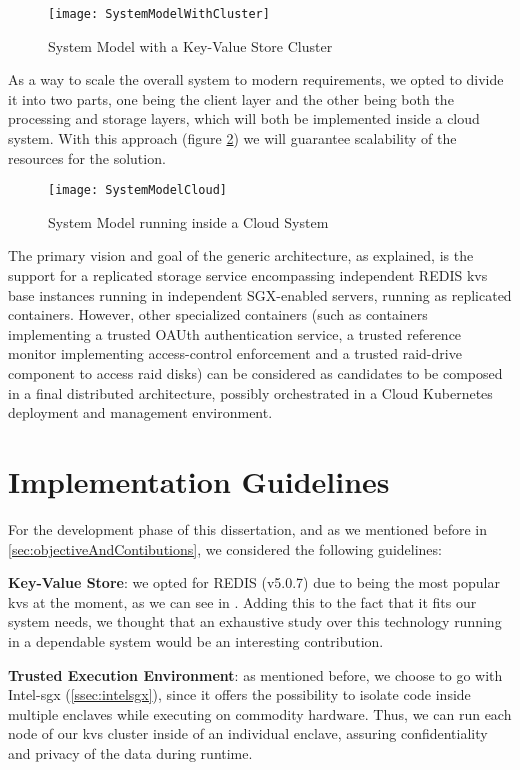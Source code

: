 \begin{figure}[htbp]
	\centering
	{\texttt{[image: SystemModelWithCluster]}}
	\caption{System Model with a Key-Value Store Cluster}
	\label{fig:systemModelCluster}
\end{figure}

As a way to scale the overall system to modern requirements, we opted to divide it into two parts, one being the client layer and the other being both the processing and storage layers, which will both be implemented inside a cloud system. With this approach (figure \ref{fig:systemModelCloud}) we will guarantee scalability of the resources for the solution. 

\begin{figure}[htbp]
	\centering
	{\texttt{[image: SystemModelCloud]}}
	\caption{System Model running inside a Cloud System}
	\label{fig:systemModelCloud}
\end{figure}

The primary vision and goal of the generic architecture, as explained, is the support for a replicated storage service encompassing independent REDIS \gls{kvs} base instances running in independent SGX-enabled servers, running as replicated containers. However, other specialized containers (such as containers implementing a trusted OAUth authentication service, a trusted reference monitor implementing access-control enforcement and a trusted \gls{raid}-drive component to access \gls{raid} disks) can be considered as candidates to be composed in a final distributed architecture, possibly orchestrated in a Cloud Kubernetes deployment and management environment.

\section{Implementation Guidelines} %

For the development phase of this dissertation, and as we mentioned before in \ref{sec:objectiveAndContibutions}, we considered the following guidelines:

\textbf{Key-Value Store}: we opted for REDIS (v5.0.7) due to being the most popular \gls{kvs} at the moment, as we can see in \cite{rankingKVStores}. Adding this to the fact that it fits our system needs, we thought that an exhaustive study over this technology running in a dependable system would be an interesting contribution.

\textbf{Trusted Execution Environment}: as mentioned before, we choose to go with Intel-\gls{sgx} (\ref{ssec:intelsgx}), since it offers the possibility to isolate code inside multiple enclaves while executing on commodity hardware. Thus, we can run each node of our \gls{kvs} cluster inside of an individual enclave, assuring confidentiality and privacy of the data during runtime.

